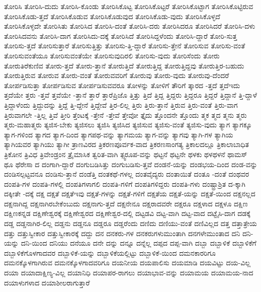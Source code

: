 {ತೋರಿಸಿ
ತೋರಿಸಿ-ದುದು
ತೋರಿಸಿ-ಕೊಂಡು
ತೋರಿಸಿಕೊಟ್ಟ
ತೋರಿಸಿಕೊಟ್ಟರೆ
ತೋರಿಸಿಕೊಟ್ಟಾಗ
ತೋರಿಸಿಕೊಟ್ಟಿರುವ
ತೋರಿಸಿಕೊಡು-ತ್ತದೆ
ತೋರಿಸಿಕೊಡುವ
ತೋರಿಸಿಕೊಡುವುದ
ತೋರಿಸಿಕೊಡು-ವುದು
ತೋರಿಸಿಕೊಳ್ಳದೆ
ತೋರಿಸಿಕೊಳ್ಳದೇ
ತೋರಿಸಿತು
ತೋರಿಸಿದ
ತೋರಿಸಿ-ದಂತೆ
ತೋರಿಸಿ-ದರು
ತೋರಿಸಿದರೂ
ತೋರಿಸಿದರೆ
ತೋರಿಸಿ-ದಳು
ತೋರಿಸಿದವನು
ತೋರಿಸಿ-ದಾಗ
ತೋರಿಸಿದು-ದಕ್ಕೆ
ತೋರಿಸಿದೆ
ತೋರಿಸಿದ್ದಳೆಂದು
ತೋರಿಸಿ-ದ್ದಾರೆ
ತೋರಿ-ಸುತ್ತ
ತೋರಿಸು-ತ್ತದೆ
ತೋರಿಸುತ್ತಾರೆ
ತೋರಿಸುತ್ತಿತ್ತು
ತೋರಿಸು-ತ್ತಿ-ದ್ದಾರೆ
ತೋರಿಸು-ತ್ತೇನೆ
ತೋರಿಸುವ
ತೋರಿಸು-ವಂತೆ
ತೋರಿಸುವಂತೆಯೂ
ತೋರಿಸುವಂತೆಯೇ
ತೋರಿಸುವುದಿರಲಿ
ತೋರಿಸು-ವುದು
ತೋರಿಸೆಂದು
ತೋರು
ತೋರುತಿರೆಕುಣಿವ
ತೋರು-ತ್ತದೆ
ತೋರು-ತ್ತಾನೆ
ತೋರುತ್ತಿದೆ
ತೋರುತ್ತಿದ್ದ
ತೋರುತ್ತಿದ್ದವು
ತೋರುತ್ತಿರ-ಬಹುದು
ತೋರುತ್ತಿರುವ
ತೋರುವ
ತೋರು-ವಂತೆ
ತೋರುವವರಿಗೆ
ತೋರುವು
ತೋರು-ವುದು
ತೋರುವು-ದೆಂದರೆ
ತೋರ್ಪಡಿಸುತ್ತಾ
ತೋರ್ಪಡಿಸುವ
ತೋರ್ಪಡಿಸುವವರೂ
ತೋಳನ್ನು
ತೋಳಿಗೆ
ತೌರಿಗೆ
ತ್ಕಾರದ
-ತ್ತದೆ
ತ್ತದೆಇದು
ತ್ತದೆಯೇ
ತ್ತರು
-ತ್ತವೆ
ತ್ತವೆಯೇ
-ತ್ತಾನೆ
ತ್ತಾರೆ
ತ್ತಾರೆಪ್ರಿಜೊ
ತ್ತಿತ್ತು
ತ್ತಿದೆ
ತ್ತಿದ್ದ
ತ್ತಿದ್ದರು
ತ್ತಿದ್ದರೂ
ತ್ತಿದ್ದರೆ
ತ್ತಿದ್ದಾನೆ
ತ್ತಿ-ದ್ದಾಳೆ
ತ್ತಿದ್ದಾಳೆಂದು
ತ್ತಿದ್ದುದನ್ನು
ತ್ತಿದ್ದೆ
ತ್ತಿ-ದ್ದೇನೆ
ತ್ತಿದ್ದೇವೆ
ತ್ತಿರ-ಲಿಲ್ಲ
ತ್ತಿರು
ತ್ತಿರು-ತ್ತಾನೆ
ತ್ತಿರುವ
ತ್ತಿರು-ವಂತೆ
ತ್ತಿರು-ವಾಗ
ತ್ತಿರುವಾಗಲೇ
-ತ್ತಿಲ್ಲ
ತ್ತಿವೆ
ತ್ತೀರಿ
ತ್ತೆಂಟಕ್ಕೆ
-ತ್ತೇನೆ
-ತ್ತೇವೆ
ತ್ತೇವೋ
ತ್ತೈದು
ತ್ತೊಂದನೇ
ತ್ತೊಂದು
ತ್ಮಕ
ತ್ಮದ
ತ್ಮನು
ತ್ಮರು
ತ್ಮರು-ಮಹಾತ್ಮರು
ತ್ಯಜಿಸ-ಬೇಕು
ತ್ಯಜಿಸಲು
ತ್ಯಜಿಸಿ
ತ್ಯಜಿಸಿದ
ತ್ಯಜಿಸುವ
ತ್ಯಜಿಸು-ವಂತೆ
ತ್ಯಜಿಸು-ವುದು
ತ್ಯಾಗ
ತ್ಯಾಗಕ್ಕೂ
ತ್ಯಾಗ-ಗಳಿಂದ
ತ್ಯಾಗದ
ತ್ಯಾಗ-ದಿಂದ
ತ್ಯಾಗಪಥ-ವನ್ನು
ತ್ಯಾಗಮಯ
ತ್ಯಾಗ-ವನ್ನು
ತ್ಯಾಗವು
ತ್ಯಾಗಿ-ಗಳ
ತ್ಯಾಗಿಯ
ತ್ಯಾಗಿಯವರ
ತ್ಯಾಗಿಯು
ತ್ಯಾಗೀ
ತ್ರಾಣವಿರದ
ತ್ರಿಕರಣಪೂರ್ವಕ-ವಾದ
ತ್ರಿಕರಣಸಾಂಗತ್ಯ
ತ್ರಿಕಾಲದಲ್ಲೂ
ತ್ರಿಕಾಲಾಬಾಧಿತ
ತ್ರಿಕೋನ
ತ್ರಿವಿಧ
ತ್ರಿವೇಂಡ್ರಂನ
ತ್ರೈಮಾಸಿಕ
ತ್ವರಿತ-ವಾಗಿ
ತ್ಸ್ವರೂಪ-ವನ್ನು
ಥಟ್ಟನೆ
ಥಟ್ಟನೇ
ಥಳಕು
ಥಳಥಳನೆ
ಥಾಮಸ್
ಥೂ
ಥೆರೇಸಾ
ದ
ದಂಗಾಗಿ-ದ್ದಾರೆ
ದಂಗುಬಡಿಸಿತ್ತು
ದಂಗುಬಡಿಸು-ತ್ತವೆ
ದಂಡನೆ-ಯನ್ನು
ದಂಡಭಯ-ದಿಂದ
ದಂಡ-ವನ್ನು
ದಂಡಿಸಲ್ಪಟ್ಟವನೂ
ದಂಡಿಸು-ತ್ತಾನೆ
ದಂಡೆತ್ತಿ
ದಂತಕಥೆ-ಗಳಲ್ಲ
ದಂತವೈದ್ಯರು
ದಂತಾಯಿತೆ
ದಂತೂ
-ದಂತೆ
ದಂಥವರ
ದಂಪತಿ-ಗಳ
ದಂಪತಿ-ಗಳಲ್ಲಿ
ದಂಪತಿಗಳಾಗಲಿ
ದಂಪತಿ-ಗಳಿಗೆ
ದಂಪತಿಗಳಿದ್ದರು
ದಂಪತಿ-ಗಳು
ದಂಷ್ಟ್ರಾಶ್ರಿತ
ದ-ಕ್ಕಾಗಿ
ದಕ್ಕೀತೇ
-ದಕ್ಕೆ
ದಕ್ಷ
ದಕ್ಷತೆ
ದಕ್ಷತೆಇವು
ದಕ್ಷತೆ-ಗಳನ್ನು
ದಕ್ಷತೆ-ಗಳಿಗೆ
ದಕ್ಷತೆಯ
ದಕ್ಷತೆ-ಯನ್ನು
ದಕ್ಷತೆ-ಯಿಂದ
ದಕ್ಷನಲ್ಲದ
ದಕ್ಷನಾಗಿದ್ದ
ದಕ್ಷನಾಗಿರಬೇಕೆಂಬುದು
ದಕ್ಷನಾಗು-ತ್ತದೆ
ದಕ್ಷನೇನೂ
ದಕ್ಷರಾದವರೇ
ದಕ್ಷರೂ
ದಕ್ಷಳಾದ
ದಕ್ಷಳೂ
ದಕ್ಷಿಣ
ದಕ್ಷಿಣಕನ್ನಡ
ದಕ್ಷಿಣೇಶ್ವರಕ್ಕೆ
ದಕ್ಷಿಣೇಶ್ವರದ
ದಕ್ಷಿಣೇಶ್ವರ-ದಲ್ಲಿ
ದಟ್ಟಡವಿ
ದಟ್ಟ-ವಾಗಿ
ದಟ್ಟ-ವಾದ
ದಟ್ಟೈಸಿ-ದಾಗ
ದಡಕ್ಕೆ
ದಡ್ಡ
ದಡ್ಡನಾಗಿರ-ಲಿಲ್ಲ
ದಡ್ಡನು
ದಡ್ಡನೂ
ದಡ್ಡರೂ
ದಡ್ಡರೆಂದು
ದಣಿದು
ದಣಿಯು-ವಂತೆ
ದಣಿವಿಲ್ಲದ
ದತ್ತ
ದತ್ತಾತ್ರೇಯ
ದತ್ತು
ದತ್ತುಸ್ವೀಕಾರ
ದತ್ತುಸ್ವೀಕಾರಕ್ಕೆ
ದದ್ದು
ದನ
ದನಕರು-ಗಳ
ದನಕರುಗಳುಮುಂತಾಗಿ
ದನಗಳೇಮುಂತಾದ
ದನಿ
ದನಿ-ಯನ್ನು
ದನಿ-ಯಿಂದ
ದನಿಯು
ದನೆಯೂ
ದನೇ
ದನ್ನು
ದನ್ನೂ
ದನ್ನೆಲ್ಲ
ದಪ್ಪದ
ದಪ್ಪ-ವಾಗಿ
ದಬ್ಬಾ
ದಬ್ಬಾಳಿಕೆ
ದಬ್ಬಾಳಿಕೆಗೆ
ದಬ್ಬಾಳಿಕೆಗೊಳಗಾದವರ
ದಬ್ಬಾಳಿಕೆ-ಯನ್ನು
ದಬ್ಬಾಳಿಕೆಯಲ್ಲಿಟ್ಟು
ದಬ್ಬಾಳಿಕೆ-ಯಿಂದ
ದಮನಕಾರರಿಗೂ
ದಮನಕ್ಕೊಳಗಾಗಿರುವ
ದಮನಕ್ಕೊಳಗಾದವರಿಗೂ
ದಯನೀಯ
ದಯಪಾಲಿಸು
ದಯಮಾಡಿ
ದಯವಿಟ್ಟು
ದಯ-ವಿಲ್ಲ
ದಯಾ
ದಯಾದಾಕ್ಷಿಣ್ಯ-ವಿಲ್ಲ
ದಯಾನಿಧಿ
ದಯಾಪರ-ರಾಗಲು
ದಯಾಭಾವ-ವನ್ನು
ದಯಾಮಯ
ದಯಾಮಯ-ನಾದ
ದಯಾಳುಗಳಾದ
ದಯಾಶೀಲರಾಗುತ್ತಾರೆ
}
